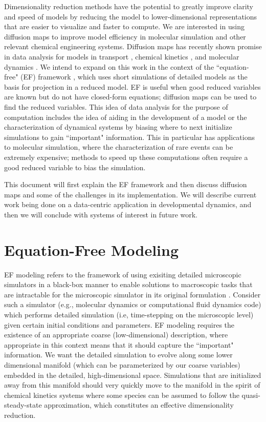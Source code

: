 \documentclass[12pt]{article}
\begin{document}
Dimensionality reduction methods have the potential to greatly improve clarity and speed of models by reducing the model to lower-dimensional representations that are easier to visualize and faster to compute. We are interested in using diffusion maps to improve model efficiency in molecular simulation and other relevant chemical engineering systems. Diffusion maps has recently shown promise in data analysis for models in transport \cite{Sonday2009}, chemical kinetics \cite{Chiavazzo2014}, and molecular dynamics \cite{Ferguson2010, Ferguson2011, Nedialkova2014, Kim2015}. We intend to expand on this work in the context of the ``equation-free" (EF) framework \cite{Kevrekidis2004}, which uses short simulations of detailed models as the basis for projection in a reduced model. EF is useful when good reduced variables are known but do not have closed-form equations; diffusion maps can be used to find the reduced variables. This idea of data analysis for the purpose of computation includes the idea of aiding in the development of a model or the characterization of dynamical systems by biasing where to next initialize simulations to gain ``important" information. This in particular has applications to molecular simulation, where the characterization of rare events can be extremely expensive; methods to speed up these computations often require a good reduced variable to bias the simulation.  \vspace{1mm}

This document will first explain the EF framework and then discuss diffusion maps and some of the challenges in its implementation. We will describe current work being done on a data-centric application in developmental dynamics, and then we will conclude with systems of interest in future work.  \vspace{1mm}

\section{Equation-Free Modeling}

EF modeling refers to the framework of using exisiting detailed microscopic simulators in a black-box manner to enable solutions to macroscopic tasks that are intractable for the microscopic simulator in its original formulation \cite{Siettos2003, Kevrekidis2003, Kevrekidis2004}. Consider such a simulator (e.g., molecular dynamics or computational fluid dynamics code) which performs detailed simulation (i.e, time-stepping on the microscopic level) given certain initial conditions and parameters. EF modeling requires the existence of an appropriate coarse (low-dimensional) description, where appropriate in this context means that it should capture the ``important" information. We want the detailed simulation to evolve along some lower dimensional manifold (which can be parameterized by our coarse variables) embedded in the detailed, high-dimensional space. Simulations that are initialized away from this manifold should very quickly move to the manifold in the spirit of chemical kinetics systems where some species can be assumed to follow the quasi-steady-state approximation, which constitutes an effective dimensionality reduction. \vspace{1mm}
\end{document}
